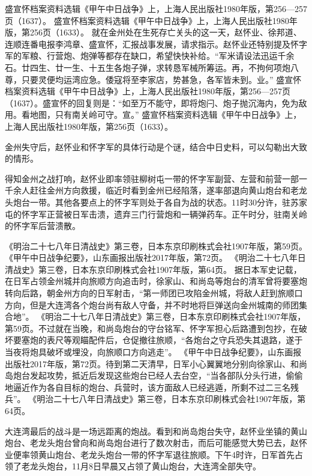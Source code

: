 \documentclass[12pt,UTF8]{ctexbook}
\begin{document}
盛宣怀档案资料选辑《甲午中日战争》上，上海人民出版社1980年版，第256—257页（1637）。
盛宣怀档案资料选辑《甲午中日战争》上，上海人民出版社1980年版，第256页（1633）。
就在金州处在生死存亡关头的这一天，赵怀业、徐邦道、连顺连番电报李鸿章、盛宣怀，汇报战事发展，请求指示。赵怀业还特别提及怀字军的军粮、行营炮、炮弹等都存在缺口，希望快快补给。“军米请设法迅运千余石。廿四生、廿一生、十五生各炮子弹，求转恳军械所筹运。再，不拘何项炮八尊，只要灵便均运湾应急。倭寇将至李家店，势甚急，各军皆未到。业。” 盛宣怀档案资料选辑《甲午中日战争》上，上海人民出版社1980年版，第256—257页（1637）。盛宣怀的回复则是：“如至万不能守，即将炮闩、炮子抛沉海内，免为敌用。看地图，只有南关岭可守。宣。” 盛宣怀档案资料选辑《甲午中日战争》上，上海人民出版社1980年版，第256页（1633）。

金州失守后，赵怀业和怀字军的具体行动是个谜，结合中日史料，可以勾勒出大致的情形。

得知金州之战打响，赵怀业即率领驻柳树屯一带的怀字军副营、左营和前营一部一千余人赶往金州方向救援，临近时看到金州已经陷落，遂率部退向黄山炮台和老龙头炮台一带。其他各要点上的怀字军则处于各自为战的状态。11时30分许，驻苏家屯的怀字军正营被日军击溃，遗弃三门行营炮和一辆弹药车。正午时分，驻南关岭的怀字军后营溃散。

《明治二十七八年日清战史》第三卷，日本东京印刷株式会社1907年版，第59页。
《甲午中日战争纪要》，山东画报出版社2017年版，第72页。
《明治二十七八年日清战史》第三卷，日本东京印刷株式会社1907年版，第64页。
据日本军史记载，在日军占领金州城并向旅顺方向追击时，徐家山、和尚岛等炮台的清军曾将要塞炮转向后路，朝金州方向的日军射击，“第一师团已攻陷金州城，将敌人赶到旅顺口方向，但是大连湾各个炮台尚有敌人守备，并不时地将巨弹送向金州城南的师团集合地”。 《明治二十七八年日清战史》第三卷，日本东京印刷株式会社1907年版，第59页。不过就在当晚，和尚岛炮台的守台铭军、怀字军担心后路遭到包抄，在破坏要塞炮的表尺等观瞄配件后，仓促撤往旅顺，“各炮台之守兵恐失其退路，遂于当夜将炮具破坏或埋没，向旅顺口方向逃走”。 《甲午中日战争纪要》，山东画报出版社2017年版，第72页。待到第二天清早，日军小心翼翼地分别向徐家山、和尚岛炮台发起攻势，抵近后发现这些炮台已经人去台空，“当各部队分头行进，偷偷地逼近作为各自目标的炮台、兵营时，该方面敌人已经逃遁，所剩不过二三名残兵”。 《明治二十七八年日清战史》第三卷，日本东京印刷株式会社1907年版，第64页。

大连湾最后的战斗是一场远距离的炮战。看到和尚岛炮台失守，赵怀业坐镇的黄山炮台、老龙头炮台曾向和尚岛炮台进行了数次射击，而后可能感觉大势已去，赵怀业便率领黄山炮台、老龙头炮台一带的怀字军退往旅顺。下午4时许，日军首先占领了老龙头炮台，11月8日早晨又占领了黄山炮台，大连湾全部失守。
\end{document}

